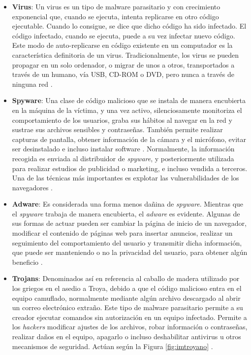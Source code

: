 \begin{itemize}
    \item \textbf{Virus}: Un virus es un tipo de malware parasitario y con crecimiento exponencial que, cuando se ejecuta, intenta replicarse en otro código ejecutable. Cuando lo consigue, se dice que dicho código ha sido infectado. El código infectado, cuando se ejecuta, puede a su vez infectar nuevo código. Este modo de auto-replicarse en código existente en un computador es la característica definitoria de un virus. Tradicionalmente, los virus se pueden propagar en un solo ordenador, o migrar de unos a otros, transportados a través de un humano, vía \gls{USB}, \gls{CD-ROM} o \gls{DVD}, pero nunca a través de ninguna red \cite{virusbomb}.
    
    \item \textbf{Spyware}: Una clase de código malicioso que se instala de manera encubierta en la máquina de la víctima, y una vez activo, silenciosamente monitoriza el comportamiento de los usuarios, graba sus hábitos al navegar en la red y sustrae sus archivos sensibles y contraseñas. También permite realizar capturas de pantalla, obtener información de la cámara y el micrófono, evitar ser desinstalado e incluso instalar software \cite{articleSpy}.  Normalmente, la información recogida es enviada al distribuidor de \textit{spyware}, y posteriormente utilizada para realizar estudios de publicidad o marketing, e incluso vendida a terceros. Una de las técnicas más importantes es explotar las vulnerabilidades de los navegadores \cite{Egele2007DynamicSA}.
    
    \item \textbf{Adware}: Es considerada una forma menos dañina de \textit{spyware}. Mientras que el \textit{spyware} trabaja de manera encubierta, el \textit{adware} es evidente. Algunas de sus formas de actuar pueden ser cambiar la página de inicio de un navegador, modificar el contenido de páginas web para insertar anuncios, realizar un seguimiento del comportamiento del usuario y transmitir dicha información, que puede ser manteniendo o no la privacidad del usuario, para obtener algún beneficio \cite{articleSpy}.
    
    \item \textbf{Trojans}: Denominados así en referencia al caballo de madera utilizado por los griegos en el asedio a Troya, debido a que el código malicioso entra en el equipo camuflado, normalmente mediante algún archivo descargado al abrir un correo electrónico extraño. Este tipo de malware parasitario permite a su creador ejecutar comandos sin autorización en un equipo infectado. Permite a los \textit{hackers} modificar ajustes de los archivos, robar información o contraseñas, realizar daños en el equipo, apagarlo o incluso
    deshabilitar antivirus u otros mecanismos de seguridad. Actúan según la Figura \ref{fig:imtroyano} \cite{trojan}.
    

\end{itemize}
